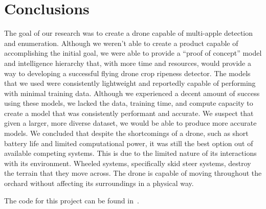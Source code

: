 \section{Conclusions}\label{sec:conclusions}
The goal of our research was to create a drone capable of multi-apple detection and
enumeration.
Although we weren't able to create a product capable of accomplishing the initial
goal, we were able to provide a ``proof of concept'' model and intelligence hierarchy
that, with more time and resources, would provide a way to developing a successful
flying drone crop ripeness detector.
The models that we used were consistently lightweight and reportedly capable of
performing with minimal training data.
Although we experienced a decent amount of success using these models, we lacked the
data, training time, and compute capacity to create a model that was consistently
performant and accurate.
We suspect that given a larger, more diverse dataset, we would be able to produce
more accurate models.
We concluded that despite the shortcomings of a drone, such as short battery life and
limited computational power, it was still the best option out of available competing
systems.
This is due to the limited nature of its interactions with its environment.
Wheeled systems, specifically skid steer systems, destroy the terrain that they move
across.
The drone is capable of moving throughout the orchard without affecting its
surroundings in a physical way.

The code for this project can be found in~\cite{FruitFly}.
